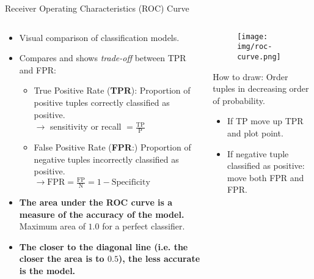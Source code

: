 \begin{frame}{Receiver Operating Characteristics (ROC) Curve}
	\vspace*{-1.5em}
	\begin{columns}
		\begin{column}{0.6\textwidth}
			\begin{itemize}
				\item Visual comparison of classification models.
				\item Compares and shows \textit{trade-off} between TPR and FPR:
				      \begin{itemize}
					      \item True Positive Rate (\textbf{TPR}): Proportion of positive tuples correctly classified as positive.\\
					            $\rightarrow$ sensitivity or recall $= \frac{\text{TP}}{\text{P}}$
					      \item False Positive Rate (\textbf{FPR}:) Proportion of negative tuples incorrectly classified as positive.\\
					            $\rightarrow \text{FPR} = \frac{\text{FP}}{\text{N}} = 1 - \text{Specificity}$
				      \end{itemize}

				\item \textbf{The area under the ROC curve is a
						      {\color{airforceblue}measure of the accuracy} of the model.}
				      Maximum area of $1.0$ for a perfect classifier.
				\item \textbf{The closer to the diagonal line (i.e. the closer the
					      area is to $0.5$), the less accurate is the model.}

			\end{itemize}
		\end{column}
		\begin{column}{0.4\textwidth}
			\vspace*{-1.5em}
			\begin{figure}
				\centering
				\texttt{[image: img/roc-curve.png]}
			\end{figure}
			\vspace*{-0.5em}
			\scriptsize
			How to draw: Order tuples in decreasing order of probability.
			\begin{itemize}
				\item If TP move up TPR and plot point.
				\item If negative tuple classified as positive: move both FPR and FPR.
			\end{itemize}
		\end{column}
	\end{columns}
\end{frame}

